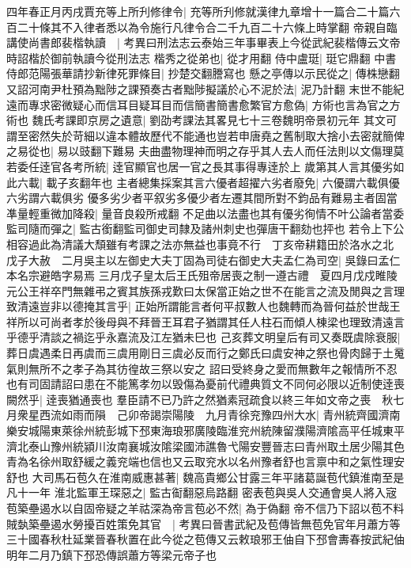 四年春正月丙戌賈充等上所刋修律令|{
	充等所刋修就漢律九章增十一篇合二十篇六百二十條其不入律者悉以為令施行凡律令合二千九百二十六條上時掌翻}
帝親自臨講使尚書郎裴楷執讀　|{
	考異曰刑法志云泰始三年事畢表上今從武紀裴楷傳云文帝時詔楷於御前執讀今從刑法志}
楷秀之從弟也|{
	從才用翻}
侍中盧珽|{
	珽它鼎翻}
中書侍郎范陽張華請抄新律死罪條目|{
	抄楚交翻謄寫也}
懸之亭傳以示民從之|{
	傳株戀翻}
又詔河南尹杜預為黜陟之課預奏古者黜陟擬議於心不泥於法|{
	泥乃計翻}
末世不能紀遠而專求密微疑心而信耳目疑耳目而信簡書簡書愈繁官方愈偽|{
	方術也言為官之方術也}
魏氏考課即京房之遺意|{
	劉劭考課法其畧見七十三卷魏明帝景初元年}
其文可謂至密然失於苛細以違本體故歷代不能通也豈若申唐堯之舊制取大捨小去密就簡俾之易從也|{
	易以豉翻下難易}
夫曲盡物理神而明之存乎其人去人而任法則以文傷理莫若委任逹官各考所統|{
	逹官顯官也居一官之長其事得專逹於上}
歲第其人言其優劣如此六載|{
	載子亥翻年也}
主者總集採案其言六優者超擢六劣者廢免|{
	六優謂六載俱優六劣謂六載俱劣}
優多劣少者平叙劣多優少者左遷其間所對不鈞品有難易主者固當凖量輕重微加降殺|{
	量音良殺所戒翻}
不足曲以法盡也其有優劣徇情不叶公論者當委監司隨而彈之|{
	監古銜翻監司御史司隸及諸州刺史也彈唐干翻劾也抨也}
若令上下公相容過此為清議大頹雖有考課之法亦無益也事竟不行　丁亥帝耕籍田於洛水之北　戊子大赦　二月吳主以左御史大夫丁固為司徒右御史大夫孟仁為司空|{
	吳錄曰孟仁本名宗避皓字易焉}
三月戊子皇太后王氏殂帝居喪之制一遵古禮　夏四月戊戍睢陵元公王祥卒門無雜弔之賓其族孫戎歎曰太保當正始之世不在能言之流及閒與之言理致清遠豈非以德掩其言乎|{
	正始所謂能言者何平叔數人也魏轉而為晉何益於世哉王祥所以可尚者孝於後母與不拜晉王耳君子猶謂其任人柱石而傾人棟梁也理致清遠言乎德乎清談之禍迄乎永嘉流及江左猶未巳也}
己亥葬文明皇后有司又奏既虞除衰服|{
	葬日虞遇柔日再虞而三虞用剛日三虞必反而行之鄭氏曰虞安神之祭也骨肉歸于土䰟氣則無所不之孝子為其彷徨故三祭以安之}
詔曰受終身之愛而無數年之報情所不忍也有司固請詔曰患在不能篤孝勿以毁傷為憂前代禮典質文不同何必限以近制使逹喪闕然乎|{
	逹喪猶通喪也}
羣臣請不已乃許之然猶素冠疏食以終三年如文帝之喪　秋七月衆星西流如雨而隕　己卯帝謁崇陽陵　九月青徐兖豫四州大水|{
	青州統齊國濟南樂安城陽東萊徐州統彭城下邳東海琅邪廣陵臨淮兖州統陳留濮陽濟隂高平任城東平濟北泰山豫州統潁川汝南襄城汝隂梁國沛譙魯弋陽安豐晉志曰青州取土居少陽其色青為名徐州取舒緩之義兖端也信也又云取兖水以名州豫者舒也言禀中和之氣性理安舒也}
大司馬石苞久在淮南威惠甚著|{
	魏高貴鄉公甘露三年平諸葛誕苞代鎮淮南至是凡十一年}
淮北監軍王琛惡之|{
	監古䘖翻惡烏路翻}
密表苞與吳人交通會吳人將入宼苞築壘遏水以自固帝疑之羊祜深為帝言苞必不然|{
	為于偽翻}
帝不信乃下詔以苞不料賊埶築壘遏水勞擾百姓策免其官　|{
	考異曰晉書武紀及苞傳皆無苞免官年月蕭方等三十國春秋杜延業晉春秋置在此今從之苞傳又云敕琅邪王伷自下邳會夀春按武紀伷明年二月乃鎮下邳恐傳誤蕭方等梁元帝子也}
